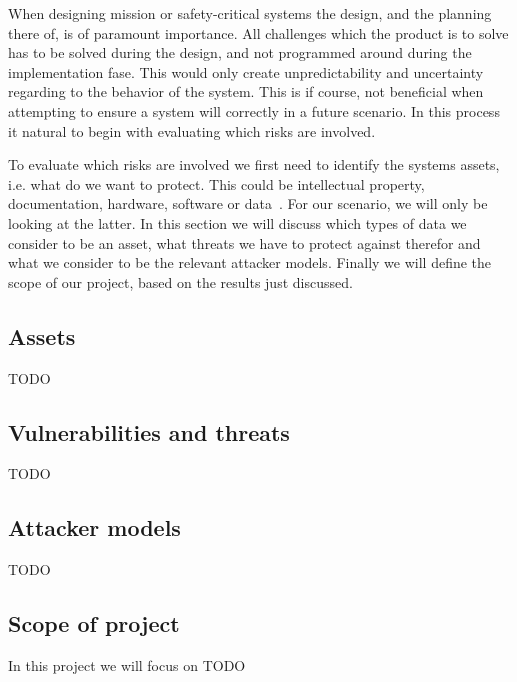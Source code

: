 
When designing mission or safety-critical systems the design, and the
planning there of, is of paramount importance. All challenges which
the product is to solve has to be solved during the design, and not
programmed around during the implementation fase. This would only
create unpredictability and uncertainty regarding to the behavior of
the system. This is if course, not beneficial when attempting to
ensure a system will correctly in a future scenario. In this process
it natural to begin with evaluating which risks are involved.

To evaluate which risks are involved we first need to identify the
systems assets, i.e. what do we want to protect. This could be
intellectual property, documentation, hardware, software or
data~\cite[p. 528]{pfleeger}. For our scenario, we will only be
looking at the latter. In this section we will discuss which types of
data we consider to be an asset, what threats we have to protect
against therefor and what we consider to be the relevant attacker
models. Finally we will define the scope of our project, based on the
results just discussed.


\subsection{Assets}

TODO


\subsection{Vulnerabilities and threats}

TODO


\subsection{Attacker models}

TODO


\subsection{Scope of project}

In this project we will focus on TODO
